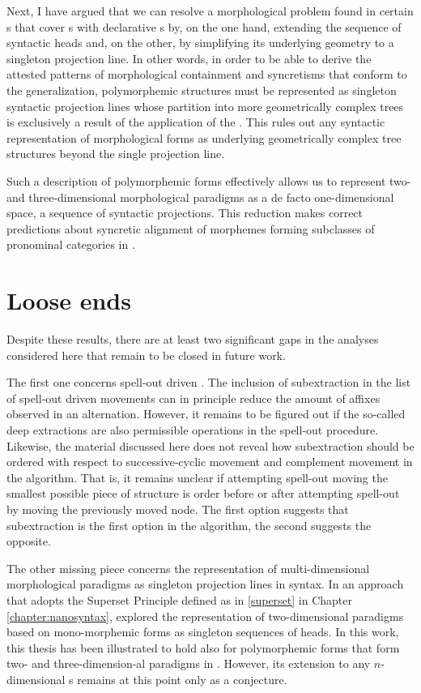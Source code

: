 \par 
Next, I have argued that we can resolve a morphological  problem found in certain  s that cover s with declarative s by, on the one hand, extending the sequence of syntactic heads  and, on the other, by simplifying its underlying geometry to a singleton projection line. In other words, in order to be able to derive the attested patterns of morphological containment and syncretisms that conform to the  generalization, polymorphemic structures must be represented as singleton syntactic projection lines whose partition into more geometrically complex trees is exclusively a result of the application of the . This rules out any syntactic representation of morphological forms as underlying geometrically complex tree structures beyond the single projection line.
\par
Such a description of polymorphemic forms effectively allows us to represent two- and three-dimensional morphological paradigms as a de facto one-dimensional space, a sequence of syntactic projections. This reduction makes correct predictions about syncretic alignment of  morphemes forming subclasses of pronominal categories in .

\section{Loose ends}

Despite these results, there are at least two significant gaps in the analyses considered here that remain to be closed in future work.
\par
The first one concerns spell-out driven . The inclusion of subextraction in the list of spell-out driven movements can in principle reduce  the amount of affixes observed in an alternation. However, it remains to be figured out if the so-called deep extractions are also permissible operations in the spell-out procedure. Likewise, the material discussed here does not reveal how subextraction should be ordered with respect to successive-cyclic movement and complement movement in the algorithm.  That is, it remains unclear if attempting spell-out moving the smallest possible piece of structure is order before or after attempting spell-out by moving the previously moved node. The first option suggests that subextraction is the first option in the algorithm, the second suggests the opposite.
\par
The other missing piece concerns the representation of multi-dimensional morphological paradigms as singleton projection lines in syntax. In an approach that adopts the Superset Principle defined as in \ref{superset} in Chapter \ref{chapter:nanosyntax}, \cite{CahaPantcheva2012} explored the representation of two-dimensional paradigms based on mono-morphemic forms as singleton sequences of heads. In this work, this thesis has been illustrated to hold also for polymorphemic forms that form two- and three-dimension-al paradigms in . However, its extension to any $n$-dimensional s remains at this point only as a conjecture.
 